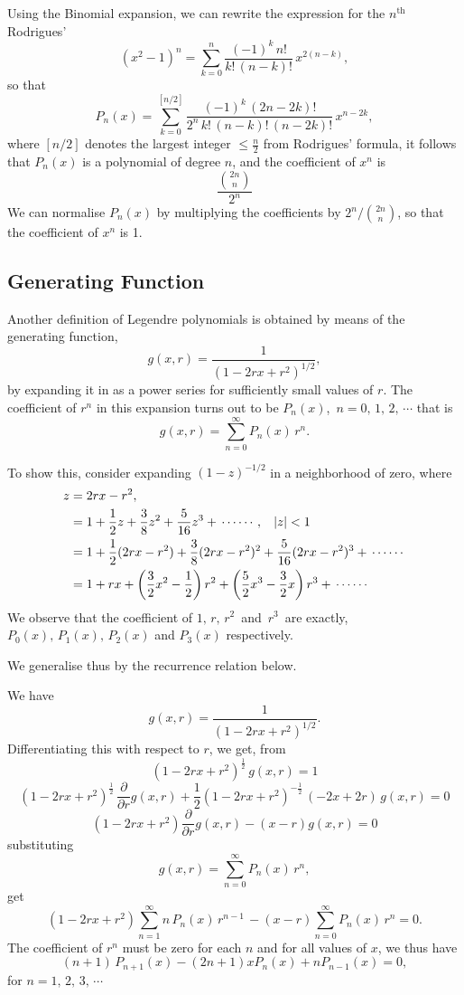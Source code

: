 \documentclass[12pt,a4paper]{report}
\theoremstyle{definition}
\theoremstyle{plain}
\begin{document}
Using the Binomial expansion, we can rewrite the expression for the $n^{\text{th}}$ Rodrigues' 
$$(x^2 - 1)^n = \sum_{k = 0}^n \frac{(-1)^k\, n!}{k!\, (n - k)!}\, x^{2(n-k)},$$ so that 
$$P_n(x) = \sum_{k = 0}^{[n/2]} \frac{(-1)^k\, (2n - 2k)!}{2^n\, k!\, (n - k)!\, (n - 2k)!}\, x^{n-2k},$$
where $[n/2]$ denotes the largest integer $\leq \frac{n}{2}$ from Rodrigues' formula, it follows that $P_n(x)$ is a polynomial of degree $n$, and the coefficient of $x^n$ is $$\frac{\binom{2n}{n}}{2^n}$$
We can normalise $P_n(x)$ by multiplying the coefficients by $2^n/\binom{2n}{n}$, so that the coefficient of $x^n$ is 1.

\subsection{Generating Function}
Another definition of Legendre polynomials is obtained by means of the generating function, $$g(x,r) = \frac{1}{(1 - 2rx + r^2)^{1/2}},$$ by expanding it in as a power series for sufficiently small values of $r$. The coefficient of $r^n$ in this expansion turns out to be $P_n(x)$, $\, n = 0, \, 1, \, 2,\, \cdots$ that is
$$g(x,r) = \sum_{n = 0}^{\infty} P_n(x) \, r^n.$$

To show this, consider expanding $(1 - z)^{-1/2}$ in a neighborhood of zero, where 
\begin{align*}
z & = 2rx - r^2,\\
  & = 1 + \frac{1}{2}z + \frac{3}{8}z^2 + \frac{5}{16}z^3 + \, \cdots\cdots\, , \hspace{0.3cm} |z| < 1\\
  & = 1 + \frac{1}{2}(2rx - r^2) + \frac{3}{8}(2rx - r^2)^2  + \frac{5}{16}(2rx - r^2)^3 + \, \cdots\cdots\, \\
  & = 1 + rx + \left(\frac{3}{2}x^2 - \frac{1}{2}\right)r^2 + \left(\frac{5}{2}x^3 - \frac{3}{2}x\right) r^3 + \, \cdots\cdots
\end{align*}
We observe that the coefficient of $1, \, r, \, r^2\,$ and $\, r^3\,$ are exactly, $P_0(x), \, P_1(x),\, P_2(x)$ and $P_3(x)$ respectively.

We generalise thus by the recurrence relation below.

We have $$g(x,r) = \frac{1}{(1 - 2rx + r^2)^{1/2}}.$$
Differentiating this with respect to $r$, we get, from 
$$(1 - 2rx + r^2)^{\frac{1}{2}}\, g(x, r) = 1$$
$$(1 - 2rx + r^2)^{\frac{1}{2}}\, \frac{\partial }{\partial r}g(x, r) + \frac{1}{2}(1 - 2rx + r^2)^{-\frac{1}{2}}\, (-2x + 2r)\, g(x,r) = 0$$
$$(1-2rx + r^2) \frac{\partial}{\partial r}g(x,r) - (x-r)g(x,r) = 0$$
substituting
$$g(x,r) = \sum_{n=0}^{\infty}P_n(x)\, r^n,$$ get
$$(1 - 2rx + r^2) \sum^{\infty}_{n=1}n\, P_n(x)\, r^{n-1}\, -(x-r)\sum_{n=0}^{\infty} P_n(x)\, r^n  = 0.$$
The coefficient of $r^n$ must be zero for each $n$ and for all values of $x$, we thus have
$$(n+1)\, P_{n+1}(x) - (2n +1)xP_n(x) + nP_{n-1}(x) = 0,$$ for $n = 1, \, 2,\, 3,\, \cdots$
\end{document}
